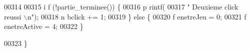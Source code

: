 \begin{DoxyCode}
00314 
00315                                                                                         \textcolor{keywordflow}{i
      f} (!partie\_terminee()) \{
00316                                                                                                 p
      rintf(
00317                                                                                                                 \textcolor{stringliteral}{"
      Deuxieme click reussi \(\backslash\)n"});
00318                                                                                                 n
      bclick += 1;
00319                                                                                         \}
       \textcolor{keywordflow}{else} \{
00320                                                                                                 f
      enetreJeu = 0;
00321                                                                                                 f
      enetreActive = 4;
00322                                                                                         \}
      
00323                                                                                 \}
      

\end{DoxyCode}
